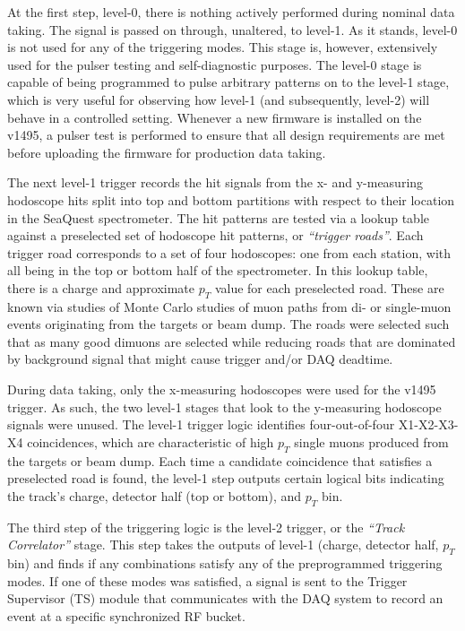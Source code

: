 At the first step, level-0, there is nothing actively performed during nominal data taking. The signal is passed on through, unaltered, to level-1. As it stands, level-0 is not used for any of the triggering modes. This stage is, however, extensively used for the pulser testing and self-diagnostic purposes. The level-0 stage is capable of being programmed to pulse arbitrary patterns on to the level-1 stage, which is very useful for observing how level-1 (and subsequently, level-2) will behave in a controlled setting. Whenever a new firmware is installed on the v1495, a pulser test is performed to ensure that all design requirements are met before uploading the firmware for production data taking.

The next level-1 trigger records the hit signals from the x- and y-measuring hodoscope hits split into top and bottom partitions with respect to their location in the SeaQuest spectrometer. The hit patterns are tested via a lookup table against a preselected set of hodoscope hit patterns, or \emph{``trigger roads''}. Each trigger road corresponds to a set of four hodoscopes: one from each station, with all being in the top or bottom half of the spectrometer. In this lookup table, there is a charge and approximate $p_T$ value for each preselected road. These are known via studies of Monte Carlo studies of muon paths from di- or single-muon events originating from the targets or beam dump. The roads were selected such that as many good dimuons are selected while reducing roads that are dominated by background signal that might cause trigger and/or DAQ deadtime.

During data taking, only the x-measuring hodoscopes were used for the v1495 trigger. As such, the two level-1 stages that look to the y-measuring hodoscope signals were unused. The level-1 trigger logic identifies four-out-of-four X1-X2-X3-X4 coincidences, which are characteristic of high $p_T$ single muons produced from the targets or beam dump. Each time a candidate coincidence that satisfies a preselected road is found, the level-1 step outputs certain logical bits indicating the track's charge, detector half (top or bottom), and $p_T$ bin.

The third step of the triggering logic is the level-2 trigger, or the \emph{``Track Correlator''} stage. This step takes the outputs of level-1 (charge, detector half, $p_T$ bin) and finds if any combinations satisfy any of the preprogrammed triggering modes. If one of these modes was satisfied, a signal is sent to the Trigger Supervisor (TS) module that communicates with the DAQ system to record an event at a specific synchronized RF bucket.

